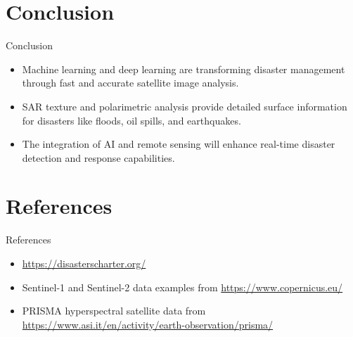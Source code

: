 \documentclass[10pt]{beamer}
\begin{document}
\section{Conclusion}
\begin{frame}{Conclusion}
    \begin{itemize}
        \item Machine learning and deep learning are transforming disaster management through fast and accurate satellite image analysis.
        \item SAR texture and polarimetric analysis provide detailed surface information for disasters like floods, oil spills, and earthquakes.
        \item The integration of AI and remote sensing will enhance real-time disaster detection and response capabilities.
    \end{itemize}
\end{frame}

\section{References}
\begin{frame}{References}
    \begin{itemize}
        \item \url{https://disasterscharter.org/}
        \item Sentinel-1 and Sentinel-2 data examples from \url{https://www.copernicus.eu/}
        \item PRISMA hyperspectral satellite data from \url{https://www.asi.it/en/activity/earth-observation/prisma/}
    \end{itemize}
\end{frame}
\end{document}
